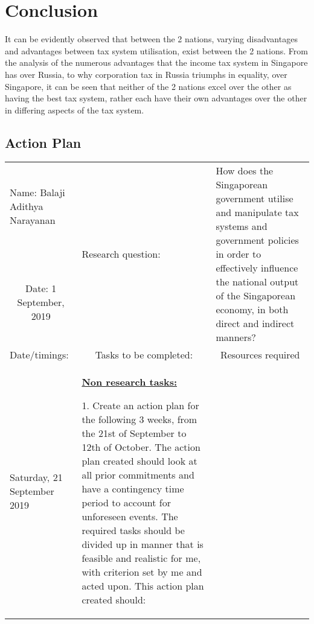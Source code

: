 \documentclass[12pt, a4paper]{article}
\newlength\combinedlength
\begin{document}
		\section{Conclusion}
		It can be evidently observed that between the 2 nations, varying disadvantages and advantages between tax system utilisation, exist between the 2 nations. From the analysis of the numerous advantages that the income tax system in Singapore has over Russia, to why corporation tax in Russia triumphs in equality, over Singapore, it can be seen that neither of the 2 nations excel over the other as having the best tax system, rather each have their own advantages over the other in differing aspects of the tax system.

	\newpage
	\begin{landscape}
	\appendix
	\appendixpage
	\appendixheaderon
	\section{Action Plan}
		\begin{longtable}{|m{5cm}|m{5cm}|m{5cm}|m{10.31cm}|}
			\hline
			
			\multicolumn{2}{|m{5cm}|}{Name: Balaji Adithya Narayanan} & \multirow{3}{10cm}{Research question:} & \multirow{3}{10.31cm}{\scriptsize How does the Singaporean government utilise and manipulate tax systems and government policies in order to effectively influence the national output of the Singaporean economy, in both direct and indirect manners?} \\
			
			\multicolumn{2}{|c|}{}& & \\
			\cline{1-2}
			
			\multicolumn{2}{|c|}{Date: 1 September, 2019} & &\\
			\hline
			
			Date/timings: & \multicolumn{2}{c}{Tasks to be completed:} &\multicolumn{1}{|c|}{Resources required}\\
			\hline
			
			Saturday, 21 September 2019 &
			\multicolumn{2}{m{\combinedlength}|}{\underline{\textbf{Non research tasks:}}
			\newline
			
			1. Create an action plan for the following 3 weeks, from the 21st of September to 12th of October. The action plan created should look at all prior commitments and have a contingency time period to account for unforeseen events. The required tasks should be divided up in manner that is feasible and realistic for me, with criterion set by me and acted upon. This action plan created should:
		
}
\end{longtable}
\end{landscape}
\end{document}
